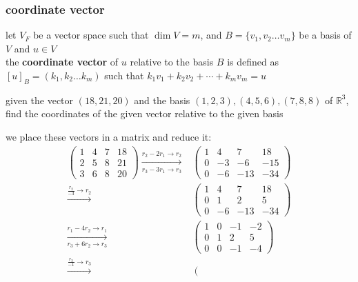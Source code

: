 \documentclass[a4paper,12pt]{article}
\begin{document}
\subsubsection{coordinate vector}
\label{sec:org33bca1f}
\begin{definition}
let \(V_F\) be a vector space such that \(\dim V = m\), and \(B=\{v_1,v_2\ldots v_m\}\) be a basis of \(V\) and \(u \in V\)\\
the \textbf{coordinate vector} of \(u\) relative to the basis \(B\) is defined as \([u]_B=(k_1,k_2\ldots k_m)\) such that \(k_1v_1+k_2v_2+\cdots+k_mv_m=u\)\\
\begin{question}
given the vector \((18,21,20)\) and the basis \((1,2,3),(4,5,6),(7,8,8)\) of \(\mathbb{R}^3\), find the coordinates of the given vector relative to the given basis\\
\begin{answer}
we place these vectors in a matrix and reduce it:\\
\begin{align*}
  \left(
    \begin{array}{ccc|c}
      1 & 4 & 7 & 18\\
      2 & 5 & 8 & 21\\
      3 & 6 & 8 & 20
    \end{array}
  \right)
  \xrightarrow[r_3 - 3r_1 \to r_3]{r_2 - 2r_1 \to r_2}&
  \left(
    \begin{array}{ccc|c}
      1 & 4 & 7 & 18\\
      0 & -3 & -6 & -15\\
      0 & -6 & -13 & -34
    \end{array}
  \right)\\
  \xrightarrow{\frac{r_2}{-3} \to r_2}&
  \left(
    \begin{array}{ccc|c}
      1 & 4 & 7 & 18\\
      0 & 1 & 2 & 5\\
      0 & -6 & -13 & -34
    \end{array}
  \right)\\
  \xrightarrow[r_3 + 6r_2 \to r_3]{r_1 - 4r_2 \to r_1}&
  \left(
    \begin{array}{ccc|c}
      1 & 0 & -1 & -2\\
      0 & 1 & 2 & 5\\
      0 & 0 & -1 & -4
    \end{array}
  \right)\\
  \xrightarrow{\frac{r_3}{-1} \to r_3}&
  \left(
    \begin{array}{ccc|c}

\end{array}
\end{align*}
\end{answer}
\end{question}
\end{definition}
\end{document}
